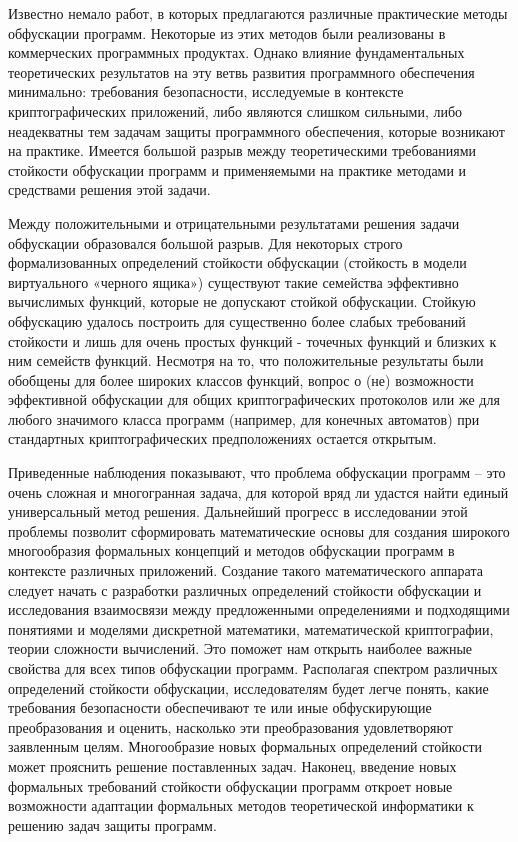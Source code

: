 Известно немало работ, в которых предлагаются различные практические методы обфускации программ. Некоторые из этих методов были реализованы в коммерческих программных продуктах. Однако влияние фундаментальных теоретических результатов на эту ветвь развития программного обеспечения минимально: требования безопасности, исследуемые в контексте криптографических приложений, либо являются слишком сильными, либо неадекватны тем задачам защиты программного обеспечения, которые возникают на практике. Имеется большой разрыв между теоретическими требованиями стойкости обфускации программ и применяемыми на практике методами и средствами решения этой задачи.

Между положительными и отрицательными результатами решения задачи обфускации образовался большой разрыв. Для некоторых строго формализованных определений стойкости обфускации (стойкость в модели виртуального «черного ящика») существуют такие семейства эффективно вычислимых функций, которые не допускают стойкой обфускации. Стойкую обфускацию удалось построить для существенно более слабых требований стойкости и лишь для очень простых функций - точечных функций и близких к ним семейств функций. Несмотря на то, что положительные результаты были обобщены для более широких классов функций, вопрос о (не) возможности эффективной обфускации для общих криптографических протоколов или же для любого значимого класса программ (например, для конечных автоматов) при стандартных криптографических предположениях остается открытым.

Приведенные наблюдения показывают, что проблема обфускации программ -- это очень сложная и многогранная задача, для которой вряд ли удастся найти единый универсальный метод решения. Дальнейший прогресс в исследовании этой проблемы позволит сформировать математические основы для создания широкого многообразия формальных концепций и методов обфускации программ в контексте различных приложений. Создание такого математического аппарата следует начать с разработки различных определений стойкости обфускации и исследования взаимосвязи между предложенными определениями и подходящими понятиями и моделями дискретной математики, математической криптографии, теории сложности вычислений. Это поможет нам открыть наиболее важные свойства для всех типов обфускации программ. Располагая спектром различных определений стойкости обфускации, исследователям будет легче понять, какие требования безопасности обеспечивают те или иные обфускирующие преобразования и оценить, насколько эти преобразования удовлетворяют заявленным целям. Многообразие новых формальных определений стойкости может прояснить решение поставленных задач. Наконец, введение новых формальных требований стойкости обфускации программ откроет новые возможности адаптации формальных методов теоретической информатики к решению задач защиты программ.